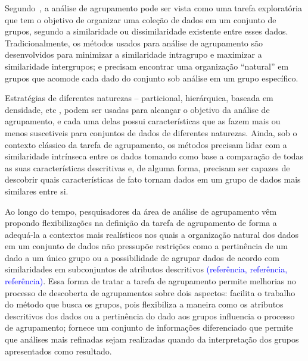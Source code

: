 \documentclass[
    12pt,                %
    oneside,            %
    a4paper,            %
    english,            %
    brazil                %
    ]{abntex2ppgsi}
\begin{document}


Segundo~, a análise de agrupamento pode ser vista como uma tarefa exploratória que tem o objetivo de organizar uma coleção de dados em um conjunto de grupos, segundo a similaridade ou dissimilaridade existente entre esses dados. Tradicionalmente, os métodos usados para análise de agrupamento são desenvolvidos para minimizar a similaridade intragrupo e maximizar a similaridade intergrupos; e precisam encontrar uma organização ``natural'' em grupos que acomode cada dado do conjunto sob análise em um grupo específico.

Estratégias de diferentes naturezas -- particional, hierárquica, baseada em densidade, etc \cite{Xu2005, han2006data}, podem ser usadas para alcançar o objetivo da análise de agrupamento, e cada uma delas possui características que as fazem mais ou menos suscetiveis para conjuntos de dados de diferentes naturezas. Ainda, sob o contexto clássico da tarefa de agrupamento, os métodos precisam lidar com a similaridade intrínseca entre os dados tomando como base a comparação de todas as suas características descritivas e, de alguma forma, precisam ser capazes de descobrir quais características de fato tornam dados em um grupo de dados mais similares entre si.

Ao longo do tempo, pesquisadores da área de análise de agrupamento vêm propondo flexibilizações na definição da tarefa de agrupamento de forma a adequá-la a contextos mais realísticos nos quais a organização natural dos dados em um conjunto de dados não pressupõe restrições como a pertinência de um dado a um único grupo ou a possibilidade de agrupar dados de acordo com similaridades em subconjuntos de atributos descritivos \textcolor{blue}{(referência, referência, referência)}. Essa forma de tratar a tarefa de agrupamento permite melhorias no processo de descoberta de agrupamentos sobre dois aspectos: facilita o trabalho do método que busca os grupos, pois flexibiliza a maneira como os atributos descritivos dos dados ou a pertinência do dado aos grupos influencia o processo de agrupamento; fornece um conjunto de informações diferenciado que permite que análises mais refinadas sejam realizadas quando da interpretação dos grupos apresentados como resultado.
\end{document}
